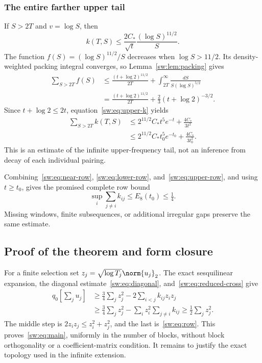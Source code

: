 \documentclass[11pt,a4paper]{article}
\numberwithin{equation}{section}
\theoremstyle{definition}\newtheorem{definition}[theorem]{Definition}
\theoremstyle{remark}\newtheorem{remark}[theorem]{Remark}
\begin{document}
\subsubsection{The entire farther upper tail}
If $S>2T$ and $v=\log S$, then
\begin{equation}\label{sw:eq:upper-k}
 k(T,S)\le\frac{2C_*}{\sqrt t}\frac{(\log S)^{11/2}}S.
\end{equation}
The function $f(S)=(\log S)^{11/2}/S$ decreases when $\log S>11/2$. Its density-weighted packing integral converges, so Lemma~\ref{sw:lem:packing} gives
\begin{align*}
 \sum_{S>2T}f(S)
 &\le\frac{(t+\log2)^{11/2}}{2T}
       +\int_{2T}^{\infty}\frac{dS}{S(\log S)^{5/2}}\\
 &=\frac{(t+\log2)^{11/2}}{2T}
       +\frac23(t+\log2)^{-3/2}.
\end{align*}
Since $t+\log2\le2t$, equation~\eqref{sw:eq:upper-k} yields
\begin{align}\label{sw:eq:upper-row}
 \sum_{S>2T}k(T,S)
 &\le2^{11/2}C_*t^5e^{-t}+\frac{4C_*}{3t^2}\\
 &\le2^{11/2}C_*t_0^5e^{-t_0}+\frac{4C_*}{3t_0^2}.\nonumber
\end{align}
This is an estimate of the infinite upper-frequency tail, not an inference from decay of each individual pairing.

Combining~\eqref{sw:eq:near-row}, \eqref{sw:eq:lower-row}, and~\eqref{sw:eq:upper-row}, and using $t\ge t_0$, gives the promised complete row bound
\begin{equation}\label{sw:eq:row}
 \sup_i\sum_{j\ne i}k_{ij}\le E_8(t_0)\le\tfrac14.
\end{equation}
Missing windows, finite subsequences, or additional irregular gaps preserve the same estimate.

\subsection{Proof of the theorem and form closure}\label{sw:sec:domain}
For a finite selection set $z_j=\sqrt{\log T_j}\norm{u_j}_2$. The exact sesquilinear expansion, the diagonal estimate~\eqref{sw:eq:diagonal}, and~\eqref{sw:eq:reduced-cross} give
\begin{align*}
 q_0\!\left[\sum_j u_j\right]
 &\ge\frac34\sum_j z_j^2-2\sum_{i<j}k_{ij}z_iz_j\\
 &\ge\frac34\sum_j z_j^2-\sum_i z_i^2\sum_{j\ne i}k_{ij}
 \ge\frac12\sum_j z_j^2.
\end{align*}
The middle step is $2z_iz_j\le z_i^2+z_j^2$, and the last is~\eqref{sw:eq:row}. This proves~\eqref{sw:eq:main}, uniformly in the number of blocks, without block orthogonality or a coefficient-matrix condition. It remains to justify the exact topology used in the infinite extension.
\end{document}
